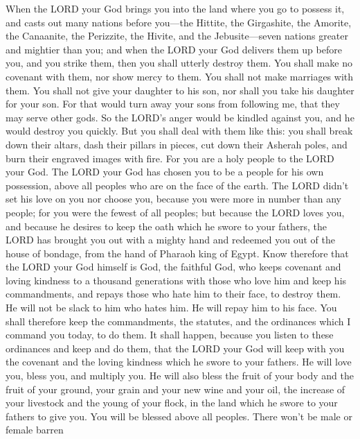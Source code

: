 	
	\mychapter{} \myverse*{}When the LORD your God brings you into the land where you go to
	possess it, and casts out many nations before you—the Hittite, the Girgashite, the Amorite, the Canaanite,
	the Perizzite, the Hivite, and the Jebusite—seven nations greater and mightier than you;
	\myverse{}and when the LORD your God delivers them up before you, and you strike them,
	then you shall utterly destroy them. You shall make no covenant with them, nor show mercy to them.
	\myverse{}You shall not make marriages with them. You shall not give your daughter to
	his son, nor shall you take his daughter for your son.
	\myverse{}For that would turn away your sons from following me, that they may serve other
	gods. So the LORD’s anger would be kindled against you, and he would destroy you quickly.
	\myverse{}But you shall deal with them like this: you shall break down their altars, dash
	their pillars in pieces, cut down their Asherah poles, and burn their engraved images with fire.
	\myverse{}For you are a holy people to the LORD your God. The LORD your God has chosen
	you to be a people for his own possession, above all peoples who are on the face of the earth.
	\myverse{}The LORD didn’t set his love on you nor choose you, because you were more in
	number than any people; for you were the fewest of all peoples;
	\myverse{}but because the LORD loves you, and because he desires to keep the oath which
	he swore to your fathers, the LORD has brought you out with a mighty hand and redeemed you out of the
	house of bondage, from the hand of Pharaoh king of Egypt.
	\myverse{}Know therefore that the LORD your God himself is God, the faithful God, who
	keeps covenant and loving kindness to a thousand generations with those who love him and keep his commandments,
	\myverse{}and repays those who hate him to their face, to destroy them. He will not
	be slack to him who hates him. He will repay him to his face.
	\myverse{}You shall therefore keep the commandments, the statutes, and the ordinances
	which I command you today, to do them.
	\myverse{}It shall happen, because you listen to these ordinances and keep and do them,
	that the LORD your God will keep with you the covenant and the loving kindness which he swore to your
	fathers.
	\myverse{}He will love you, bless you, and multiply you. He will also bless the fruit
	of your body and the fruit of your ground, your grain and your new wine and your oil, the increase of
	your livestock and the young of your flock, in the land which he swore to your fathers to give you.
	\myverse{}You will be blessed above all peoples. There won’t be male or female barren
